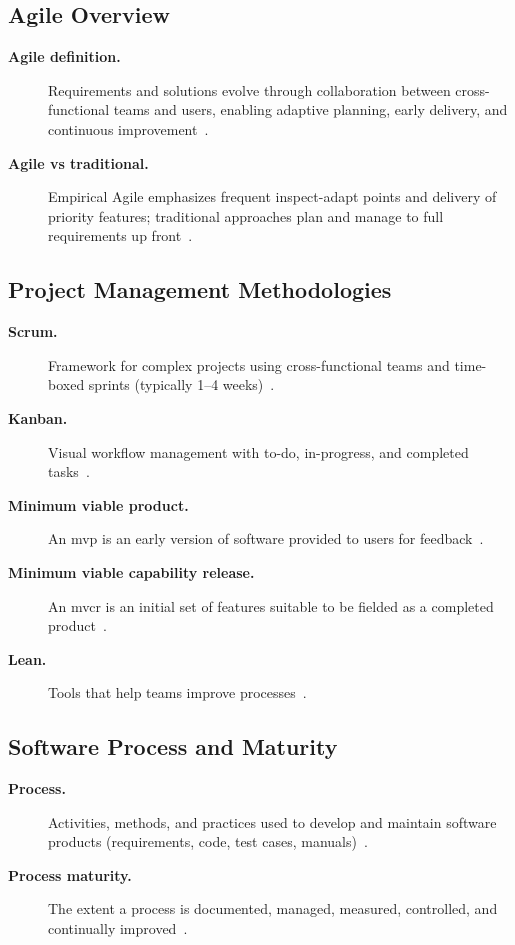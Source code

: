 \documentclass[../main.tex]{subfiles}
\begin{document}
\subsection{Agile Overview}
\begin{description}
  \item[\textbf{Agile definition.}] Requirements and solutions evolve through collaboration between cross-functional teams and users, enabling adaptive planning, early delivery, and continuous improvement~\autocite{edo-3-4-2-software-acquisition-management-2025}.
  \item[\textbf{Agile vs traditional.}] Empirical Agile emphasizes frequent inspect-adapt points and delivery of priority features; traditional approaches plan and manage to full requirements up front~\autocite{edo-3-4-2-software-acquisition-management-2025}.
\end{description}

\subsection{Project Management Methodologies}
\begin{description}
  \item[\textbf{Scrum.}] Framework for complex projects using cross-functional teams and time-boxed sprints (typically 1--4 weeks)~\autocite{edo-3-4-2-software-acquisition-management-2025}.
  \item[\textbf{Kanban.}] Visual workflow management with to-do, in-progress, and completed tasks~\autocite{edo-3-4-2-software-acquisition-management-2025}.
  \item[\textbf{Minimum viable product.}] An \ac{mvp} is an early version of software provided to users for feedback~\autocite{edo-3-4-2-software-acquisition-management-2025}.
  \item[\textbf{Minimum viable capability release.}] An \ac{mvcr} is an initial set of features suitable to be fielded as a completed product~\autocite{edo-3-4-2-software-acquisition-management-2025}.
  \item[\textbf{Lean.}] Tools that help teams improve processes~\autocite{edo-3-4-2-software-acquisition-management-2025}.
\end{description}

\subsection{Software Process and Maturity}
\begin{description}
  \item[\textbf{Process.}] Activities, methods, and practices used to develop and maintain software products (requirements, code, test cases, manuals)~\autocite{edo-3-4-2-software-acquisition-management-2025}.
  \item[\textbf{Process maturity.}] The extent a process is documented, managed, measured, controlled, and continually improved~\autocite{edo-3-4-2-software-acquisition-management-2025}.
\end{description}
\end{document}

